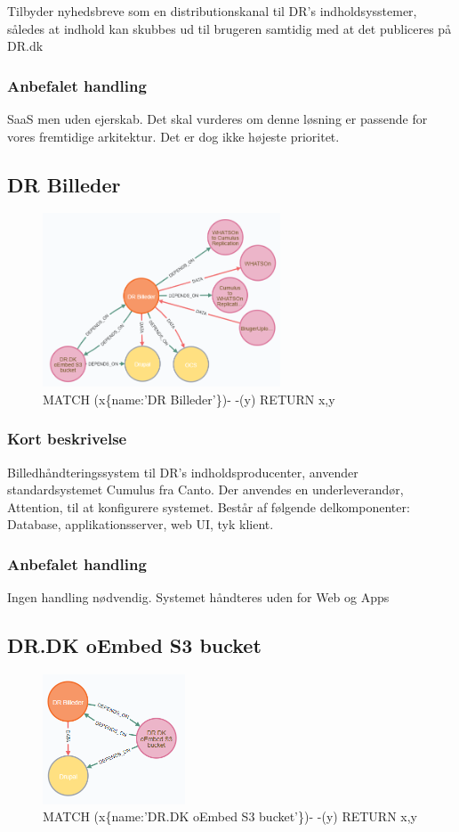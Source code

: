 \documentclass{article}
\begin{document}
Tilbyder nyhedsbreve som en distributionskanal til DR's indholdsysstemer, således at indhold kan skubbes ud til brugeren samtidig med at det publiceres på DR.dk
\subsubsection{Anbefalet handling}
SaaS men uden ejerskab. 
Det skal vurderes om denne løsning er passende for vores fremtidige arkitektur. Det er dog ikke højeste prioritet.



\subsection{DR Billeder}
\begin{figure}[h]
\includegraphics[width=200pt]{DRBilleder.PNG}
\caption{MATCH (x\{name:'DR Billeder'\})- -(y) RETURN x,y}
\end{figure}
\subsubsection{Kort beskrivelse}
Billedhåndteringssystem til DR's indholdsproducenter, anvender standardsystemet Cumulus fra Canto. Der anvendes en underleverandør, Attention, til at konfigurere systemet. Består af følgende delkomponenter: Database, applikationsserver, web UI, tyk klient.
\subsubsection{Anbefalet handling}
Ingen handling nødvendig. Systemet håndteres uden for Web og Apps



\subsection{DR.DK oEmbed S3 bucket}
\begin{figure}[h]
\includegraphics[width=120pt]{S3Bucket.PNG}
\caption{MATCH (x\{name:'DR.DK oEmbed S3 bucket'\})- -(y) RETURN x,y}
\end{figure}
\end{document}
